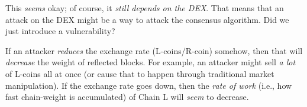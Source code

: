 
This \emph{seems} okay; of course, it \emph{still depends on the DEX}.
That means that an attack on the DEX might be a way to attack the consensus algorithm.
Did we just introduce a vulnerability?

If an attacker \emph{reduces} the exchange rate (L-coins/R-coin) somehow, then that will \emph{decrease} the weight of reflected blocks.
For example, an attacker might sell \emph{a lot} of L-coins all at once (or cause that to happen through traditional market manipulation).
If the exchange rate goes down, then the \emph{rate of work} (i.e., how fast chain-weight is accumulated) of Chain L will \emph{seem} to decrease.


